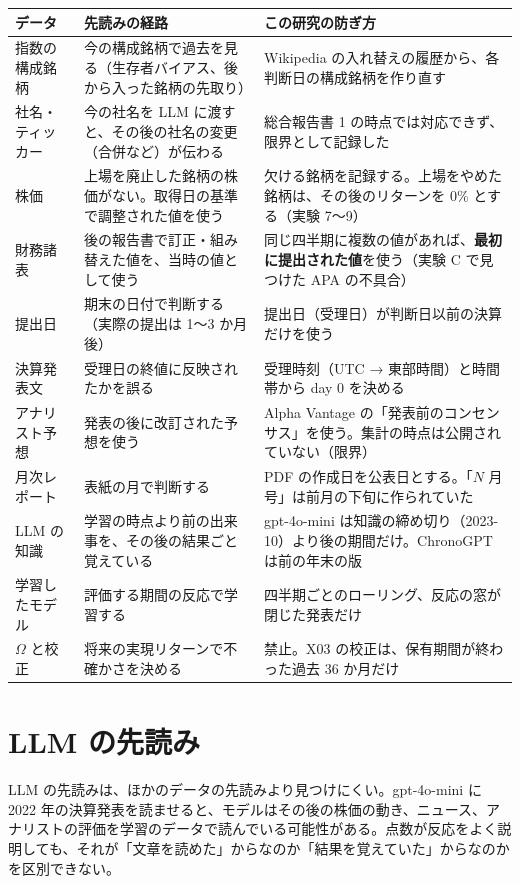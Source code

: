 \begin{longtable}{P{3.0cm}P{5.4cm}P{6.0cm}}
\toprule
\textbf{データ} & \textbf{先読みの経路} & \textbf{この研究の防ぎ方} \\
\midrule
\endhead
\bottomrule
\endfoot
指数の構成銘柄 & 今の構成銘柄で過去を見る（生存者バイアス、後から入った銘柄の先取り） & Wikipedia の入れ替えの履歴から、各判断日の構成銘柄を作り直す \\
社名・ティッカー & 今の社名を LLM に渡すと、その後の社名の変更（合併など）が伝わる & 総合報告書 1 の時点では対応できず、限界として記録した \\
株価 & 上場を廃止した銘柄の株価がない。取得日の基準で調整された値を使う & 欠ける銘柄を記録する。上場をやめた銘柄は、その後のリターンを 0\% とする（実験 7〜9） \\
財務諸表 & 後の報告書で訂正・組み替えた値を、当時の値として使う & 同じ四半期に複数の値があれば、\textbf{最初に提出された値}を使う（実験 C で見つけた APA の不具合） \\
提出日 & 期末の日付で判断する（実際の提出は 1〜3 か月後） & 提出日（受理日）が判断日以前の決算だけを使う \\
決算発表文 & 受理日の終値に反映されたかを誤る & 受理時刻（UTC → 東部時間）と時間帯から day 0 を決める \\
アナリスト予想 & 発表の後に改訂された予想を使う & Alpha Vantage の「発表前のコンセンサス」を使う。集計の時点は公開されていない（限界） \\
月次レポート & 表紙の月で判断する & PDF の作成日を公表日とする。「$N$ 月号」は前月の下旬に作られていた \\
LLM の知識 & 学習の時点より前の出来事を、その後の結果ごと覚えている & gpt-4o-mini は知識の締め切り（2023-10）より後の期間だけ。ChronoGPT は前の年末の版 \\
学習したモデル & 評価する期間の反応で学習する & 四半期ごとのローリング、反応の窓が閉じた発表だけ \\
$\Omega$ と校正 & 将来の実現リターンで不確かさを決める & 禁止。X03 の校正は、保有期間が終わった過去 36 か月だけ \\
\end{longtable}

\section{LLM の先読み}

LLM の先読みは、ほかのデータの先読みより見つけにくい。gpt-4o-mini に 2022 年の決算発表を読ませると、モデルはその後の株価の動き、ニュース、アナリストの評価を学習のデータで読んでいる可能性がある。点数が反応をよく説明しても、それが「文章を読めた」からなのか「結果を覚えていた」からなのかを区別できない。

